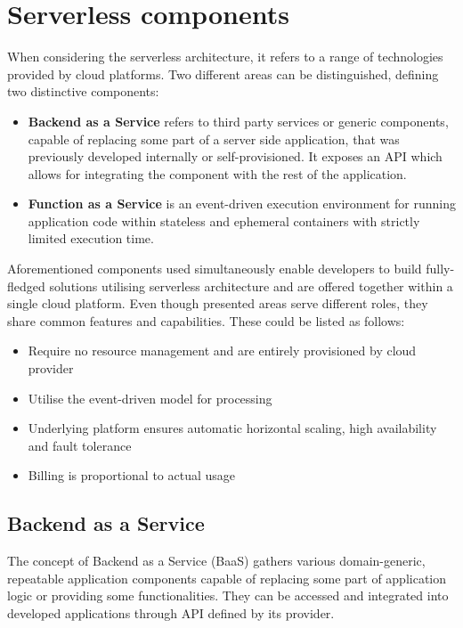 \section{Serverless components} \label{section:serverless-components}

When considering the serverless architecture, it refers to a range of technologies provided by cloud platforms. Two different areas can be distinguished, defining two distinctive components:

\begin{itemize}
    \item \textbf{Backend as a Service} refers to third party services or generic components, capable of replacing some part of a server side application, that was previously developed internally or self-provisioned. It exposes an API which allows for integrating the component with the rest of the application.
    \item \textbf{Function as a Service} is an event-driven execution environment for running application code within stateless and ephemeral containers with strictly limited execution time.
\end{itemize}

Aforementioned components used simultaneously enable developers to build fully-fledged solutions utilising serverless architecture and are offered together within a single cloud platform.
Even though presented areas serve different roles, they share common features and capabilities. These could be listed as follows:

\begin{itemize}
    \item Require no resource management and are entirely provisioned by cloud provider
    \item Utilise the event-driven model for processing
    \item Underlying platform ensures automatic horizontal scaling, high availability and fault tolerance
    \item Billing is proportional to actual usage
\end{itemize}

\subsection{Backend as a Service}

The concept of Backend as a Service (BaaS) gathers various domain-generic, repeatable application components capable of replacing some part of application logic or providing some functionalities. They can be accessed and integrated into developed applications through API defined by its provider.

